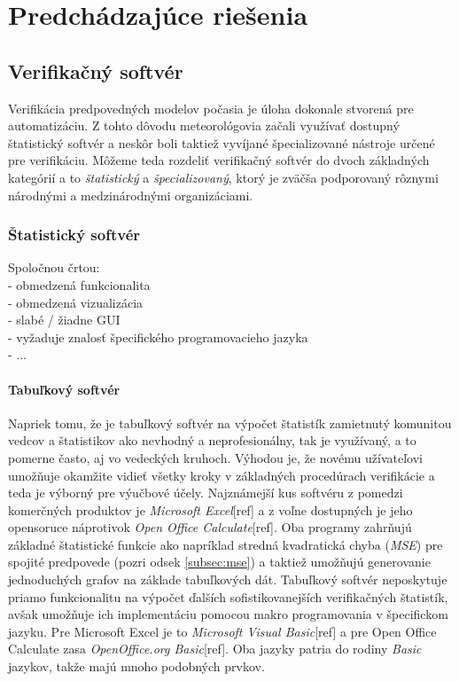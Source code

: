 \chapter{Predchádzajúce riešenia}

\section{Verifikačný softvér}

Verifikácia predpovedných modelov počasia je úloha dokonale stvorená pre automatizáciu. 
Z tohto dôvodu meteorológovia začali využívať dostupný štatistický softvér 
a neskôr boli taktiež vyvíjané špecializované nástroje určené pre verifikáciu.
Môžeme teda rozdeliť verifikačný softvér do dvoch základných kategórií a to \textit{štatistický} a \textit{špecializovaný}, ktorý je zväčša podporovaný rôznymi národnými a medzinárodnými organizáciami.

\subsection{Štatistický softvér}
Spoločnou črtou: \\
	- obmedzená funkcionalita \\
	- obmedzená vizualizácia \\
	- slabé / žiadne GUI \\
	- vyžaduje znalosť špecifického programovacieho jazyka \\
	- ...


\subsubsection{Tabuľkový softvér}
Napriek tomu, že je tabuľkový softvér na výpočet štatistík zamietnutý komunitou vedcov a štatistikov ako nevhodný a neprofesionálny, tak je využívaný, a to pomerne často, aj vo vedeckých kruhoch. 
Výhodou je, že novému užívateľovi umožňuje okamžite vidieť všetky kroky v základných procedúrach verifikácie a teda je výborný pre výučbové účely. \cite{VerifSoft} 
Najznámejší kus softvéru z pomedzi komerčných produktov je \textit{Microsoft Excel}[ref] a z voľne dostupných je jeho opensoruce náprotivok \textit{Open Office Calculate}[ref]. Oba programy zahrňujú základné štatistické funkcie ako napríklad stredná kvadratická chyba (\textit{MSE}) pre spojité predpovede (pozri odsek \ref{subsec:mse}) a taktiež umožňujú generovanie jednoduchých grafov na základe tabuľkových dát. Tabuľkový softvér neposkytuje priamo funkcionalitu na výpočet ďalších sofistikovanejších verifikačných štatistík, avšak umožňuje ich implementáciu pomocou makro programovania v špecifickom jazyku. Pre Microsoft Excel je to \textit{Microsoft Visual Basic}[ref] a pre Open Office Calculate zasa \textit{OpenOffice.org Basic}[ref]. Oba jazyky patria do rodiny \textit{Basic} jazykov, takže majú mnoho podobných prvkov.  


